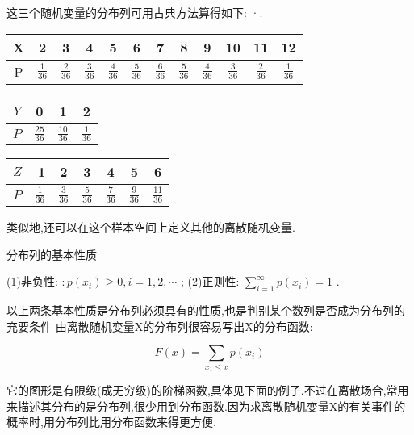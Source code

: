 这三个随机变量的分布列可用古典方法算得如下:
·.
\begin{table}[htbp]
	\centering
	\begin{tabular}{c|ccccccccccc}
		X     & 2     & 3     & 4     & 5     & 6     & \multicolumn{1}{c}{7} & \multicolumn{1}{c}{8} & \multicolumn{1}{c}{9} & \multicolumn{1}{c}{10} & \multicolumn{1}{c}{11} & \multicolumn{1}{c}{12} \\\midrule
		P     & $ \frac{1}{36} $ & $ \frac{2}{36} $ & $ \frac{3}{36} $ & $ \frac{4}{36} $ & $ \frac{5}{36} $ & $ \frac{6}{36} $ & $ \frac{5}{36} $ & $ \frac{4}{36} $ & $ \frac{3}{36} $ & $ \frac{2}{36} $ & $ \frac{1}{36} $ \\
	\end{tabular}%
	
	\begin{tabular}{c|ccc}
		 $ Y $ & 0     & 1     & 2 \\\midrule
		 $ P $ & $ \frac{25}{36} $ & $ \frac{10}{36} $ & $ \frac{1}{36} $ \\
	\end{tabular}%
	
	\begin{tabular}{c|rccccc}
		 $ Z $ & 1 & 2     & 3     & 4     & 5     & 6 \\\midrule
		 $ P $ & $ \frac{1}{36} $ & $ \frac{3}{36} $ & $ \frac{5}{36} $ & $ \frac{7}{36} $ & $ \frac{9}{36} $ & $ \frac{11}{36} $ \\
	\end{tabular}%
\end{table}%


类似地,还可以在这个样本空间上定义其他的离散随机变量.

分布列的基本性质


(1)非负性: $ : p\left(x_{t}\right) \geqslant 0, i=1,2, \cdots $ ;
(2)正则性: $ \sum_{i=1}^{\infty} p\left(x_{i}\right)=1 $ .

以上两条基本性质是分布列必须具有的性质,也是判别某个数列是否成为分布列的充要条件
由离散随机变量X的分布列很容易写出X的分布函数:

\[ 
F(x)=\sum_{x_{1} \leqslant x} p\left(x_{i}\right)
\]

它的图形是有限级(成无穷级)的阶梯函数,具体见下面的例子.不过在离散场合,常用来描述其分布的是分布列,很少用到分布函数.因为求离散随机变量X的有关事件的概率时,用分布列比用分布函数来得更方便.

